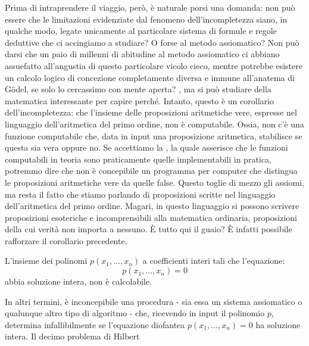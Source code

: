Prima di intraprendere il viaggio, però, è naturale porsi una domanda: non può essere che le limitazioni evidenziate dal fenomeno dell'incompletezza siano, in qualche modo, legate unicamente al particolare sistema di formule e regole deduttive che ci accingiamo a studiare? O forse al metodo assiomatico? Non può darsi che un paio di millenni di abitudine al metodo assiomatico ci abbiano 
assuefatto all'angustia di questo particolare vicolo cieco, mentre potrebbe esistere un calcolo logico di concezione completamente diversa e immune all'anatema di Gödel, se solo lo cercassimo con mente aperta? , 
ma si può studiare della matematica interessante per capire perché. Intanto, questo è un corollario dell'incompletezza: che l'insieme delle proposizioni aritmetiche vere, espresse nel linguaggio dell'aritmetica del primo ordine, non è computabile. Ossia, non c'è una funzione computabile che, data in input una proposizione 
aritmetica, stabilisce se questa sia vera oppure no. Se accettiamo la , la quale asserisce che le funzioni computabili in teoria sono praticamente quelle implementabili in pratica, potremmo dire che non è concepibile un programma per computer che distingua le proposizioni aritmetiche vere da quelle false.
Questo toglie di mezzo gli assiomi, ma resta il fatto che stiamo parlando di proposizioni scritte nel linguaggio dell'aritmetica del primo ordine. Magari, in questo linguaggio si possono scrivere proposizioni esoteriche e incomprensibili alla matematica ordinaria, proposizioni della cui verità non importa a nessuno. È tutto qui il guaio?
 È infatti possibile rafforzare il corollario precedente.

\begin{theorem}
    L'insieme dei polinomi $p(x_1,\dots,x_n)$ a coefficienti interi tali che l'equazione:
    \[ p(x_1,\dots,x_n) = 0\]
    abbia soluzione intera, non è calcolabile.
\end{theorem}

In altri termini, è inconcepibile una procedura - sia essa un sistema assiomatico o qualunque altro tipo di algoritmo - che, ricevendo in input il polinomio $p$, determina infallibilmente se l'equazione diofantea $p(x_1,\dots,x_n) = 0$ ha soluzione intera.
Il decimo problema di Hilbert

